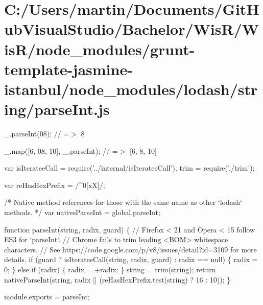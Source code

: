 \hypertarget{_c_1_2_users_2martin_2_documents_2_git_hub_visual_studio_2_bachelor_2_wis_r_2_wis_r_2node_module34105f9a676d4cb3a7ea56f04151b49c}{}\section{C\+:/\+Users/martin/\+Documents/\+Git\+Hub\+Visual\+Studio/\+Bachelor/\+Wis\+R/\+Wis\+R/node\+\_\+modules/grunt-\/template-\/jasmine-\/istanbul/node\+\_\+modules/lodash/string/parse\+Int.\+js}
\+\_\+.\+parse\+Int(\textquotesingle{}08\textquotesingle{}); // =$>$ 8

\+\_\+.\+map(\mbox{[}\textquotesingle{}6\textquotesingle{}, \textquotesingle{}08\textquotesingle{}, \textquotesingle{}10\textquotesingle{}\mbox{]}, \+\_\+.\+parse\+Int); // =$>$ \mbox{[}6, 8, 10\mbox{]}


\begin{DoxyCodeInclude}
var isIterateeCall = require(\textcolor{stringliteral}{'../internal/isIterateeCall'}),
    trim = require(\textcolor{stringliteral}{'./trim'});

var reHasHexPrefix = /^0[xX]/;

\textcolor{comment}{/* Native method references for those with the same name as other `lodash` methods. */}
var nativeParseInt = global.parseInt;

\textcolor{keyword}{function} parseInt(\textcolor{keywordtype}{string}, radix, guard) \{
  \textcolor{comment}{// Firefox < 21 and Opera < 15 follow ES3 for `parseInt`.}
  \textcolor{comment}{// Chrome fails to trim leading <BOM> whitespace characters.}
  \textcolor{comment}{// See https://code.google.com/p/v8/issues/detail?id=3109 for more details.}
  \textcolor{keywordflow}{if} (guard ? isIterateeCall(\textcolor{keywordtype}{string}, radix, guard) : radix == null) \{
    radix = 0;
  \} \textcolor{keywordflow}{else} \textcolor{keywordflow}{if} (radix) \{
    radix = +radix;
  \}
  \textcolor{keywordtype}{string} = trim(\textcolor{keywordtype}{string});
  \textcolor{keywordflow}{return} nativeParseInt(\textcolor{keywordtype}{string}, radix || (reHasHexPrefix.test(\textcolor{keywordtype}{string}) ? 16 : 10));
\}

module.exports = parseInt;
\end{DoxyCodeInclude}
 
